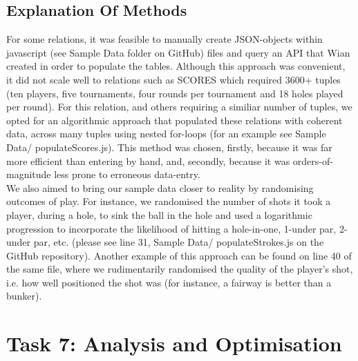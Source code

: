 \documentclass[titlepage]{article}
\begin{document}
\subsection{Explanation Of Methods}
\vspace{1em}
For some relations, it was feasible to manually create JSON-objects within javascript (see Sample Data folder on GitHub) files and query an API that Wian
created in order to populate the tables. Although this approach was convenient, it did not scale well to relations such as SCORES which required
3600+ tuples (ten players, five tournaments, four rounds per tournament and 18 holes played per round). For this relation,
and others requiring a similiar number of tuples, we opted for an algorithmic approach that populated these relations with 
coherent data, across many tuples using nested for-loops (for an example see Sample Data/ populateScores.js). This method was
chosen, firstly, because it was far more efficient than entering by hand, and, secondly, because it was orders-of-magnitude less prone
to erroneous data-entry. \\

\noindent
We also aimed to bring our sample data closer to reality by randomising outcomes of play. For instance, we randomised the number
of shots it took a player, during a hole, to sink the ball in the hole and used a logarithmic progression to incorporate the likelihood
of hitting a hole-in-one, 1-under par, 2-under par, etc. (please see line 31, Sample Data/ populateStrokes.js on the GitHub repository).
Another example of this approach can be found on line 40 of the same file, where we rudimentarily randomised the quality of the player's shot,
i.e. how well positioned the shot was (for instance, a fairway is better than a bunker). 

\newpage



\section{Task 7: Analysis and Optimisation}
\vspace{1em}
\end{document}
